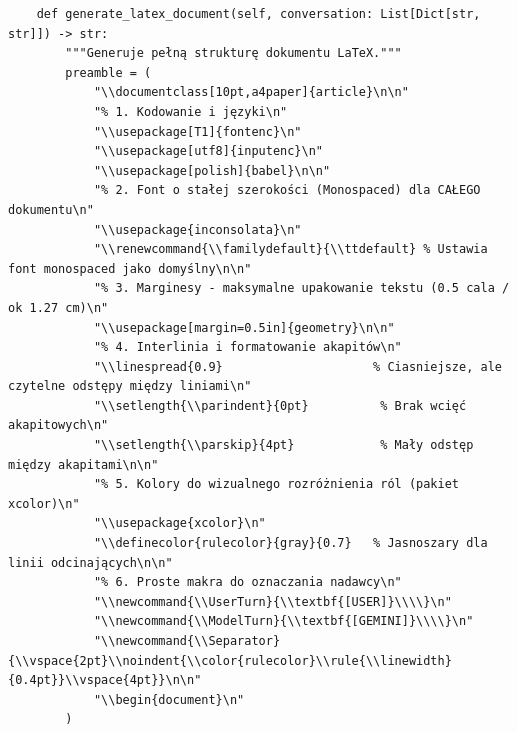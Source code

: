 \documentclass[10pt,a4paper]{article}
\renewcommand{\familydefault}{\ttdefault}
\newcommand{\UserTurn}{\textbf{[USER]}\par\medskip}
\newcommand{\ModelTurn}{\textbf{[GEMINI]}\par\medskip}
\newcommand{\Separator}{\par\vspace{4pt}\noindent{\color{rulecolor}\rule{\linewidth}{0.4pt}}\par\vspace{6pt}}
\begin{document}
\begin{verbatim}
    def generate_latex_document(self, conversation: List[Dict[str, str]]) -> str:
        """Generuje pełną strukturę dokumentu LaTeX."""
        preamble = (
            "\\documentclass[10pt,a4paper]{article}\n\n"
            "% 1. Kodowanie i języki\n"
            "\\usepackage[T1]{fontenc}\n"
            "\\usepackage[utf8]{inputenc}\n"
            "\\usepackage[polish]{babel}\n\n"
            "% 2. Font o stałej szerokości (Monospaced) dla CAŁEGO dokumentu\n"
            "\\usepackage{inconsolata}\n"
            "\\renewcommand{\\familydefault}{\\ttdefault} % Ustawia font monospaced jako domyślny\n\n"
            "% 3. Marginesy - maksymalne upakowanie tekstu (0.5 cala / ok 1.27 cm)\n"
            "\\usepackage[margin=0.5in]{geometry}\n\n"
            "% 4. Interlinia i formatowanie akapitów\n"
            "\\linespread{0.9}                     % Ciasniejsze, ale czytelne odstępy między liniami\n"
            "\\setlength{\\parindent}{0pt}          % Brak wcięć akapitowych\n"
            "\\setlength{\\parskip}{4pt}            % Mały odstęp między akapitami\n\n"
            "% 5. Kolory do wizualnego rozróżnienia ról (pakiet xcolor)\n"
            "\\usepackage{xcolor}\n"
            "\\definecolor{rulecolor}{gray}{0.7}   % Jasnoszary dla linii odcinających\n\n"
            "% 6. Proste makra do oznaczania nadawcy\n"
            "\\newcommand{\\UserTurn}{\\textbf{[USER]}\\\\}\n"
            "\\newcommand{\\ModelTurn}{\\textbf{[GEMINI]}\\\\}\n"
            "\\newcommand{\\Separator}{\\vspace{2pt}\\noindent{\\color{rulecolor}\\rule{\\linewidth}{0.4pt}}\\vspace{4pt}}\n\n"
            "\\begin{document}\n"
        )


\end{verbatim}
\end{document}
